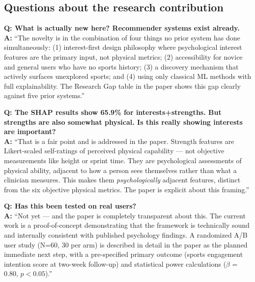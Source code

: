 \documentclass[12pt,a4paper]{article}
\begin{document}
\subsection{Questions about the research contribution}

\begin{qabox}
\textbf{Q: What is actually new here? Recommender systems exist already.}\\[4pt]
\textbf{A:} ``The novelty is in the combination of four things no prior
system has done simultaneously: (1) interest-first design philosophy where
psychological interest features are the primary input, not physical metrics;
(2) accessibility for novice and general users who have no sports history;
(3) a discovery mechanism that actively surfaces unexplored sports; and
(4) using only classical ML methods with full explainability. The Research Gap
table in the paper shows this gap clearly against five prior systems.''
\end{qabox}

\begin{qabox}
\textbf{Q: The SHAP results show 65.9\% for interests+strengths. But strengths
are also somewhat physical. Is this really showing interests are important?}\\[4pt]
\textbf{A:} ``That is a fair point and is addressed in the paper. Strength
features are Likert-scaled self-ratings of perceived physical capability ---
not objective measurements like height or sprint time. They are psychological
assessments of physical ability, adjacent to how a person sees themselves
rather than what a clinician measures. This makes them \emph{psychologically}
adjacent features, distinct from the six objective physical metrics. The paper
is explicit about this framing.''
\end{qabox}

\begin{qabox}
\textbf{Q: Has this been tested on real users?}\\[4pt]
\textbf{A:} ``Not yet --- and the paper is completely transparent about this.
The current work is a proof-of-concept demonstrating that the framework is
technically sound and internally consistent with published psychology findings.
A randomized A/B user study (N=60, 30 per arm) is described in detail in the
paper as the planned immediate next step, with a pre-specified primary outcome
(sports engagement intention score at two-week follow-up) and statistical
power calculations ($\beta$ = 0.80, $p < 0.05$).''
\end{qabox}
\end{document}
